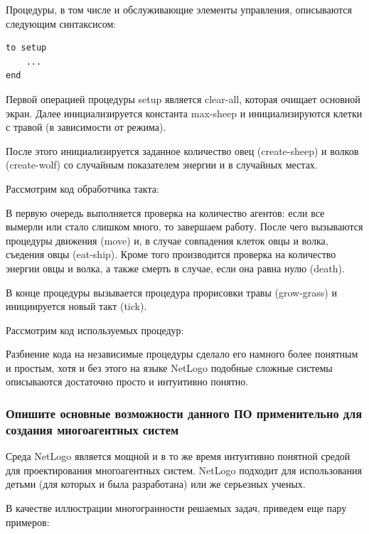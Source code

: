 \documentclass[14pt,a4paper,report]{report}
\begin{document}
Процедуры, в том числе и обслуживающие элементы управления, описываются следующим синтаксисом:

\begin{verbatim}
to setup
    ...
end
\end{verbatim}

Первой операцией процедуры setup является clear-all, которая очищает основной экран. Далее инициализируется константа max-sheep и инициализируются клетки с травой (в зависимости от режима).

После этого инициализируется заданное количество овец (create-sheep) и волков (create-wolf) со случайным показателем энергии и в случайных местах.

Рассмотрим код обработчика такта:



В первую очередь выполняется проверка на количество агентов: если все вымерли или стало слишком много, то завершаем работу. После чего вызываются процедуры движения (move) и, в случае совпадения клеток овцы и волка, съедения овцы (eat-ship). Кроме того производится проверка на количество энергии овцы и волка, а также смерть в случае, если она равна нулю (death).

В конце процедуры вызывается процедура прорисовки травы (grow-grass) и инициируется новый такт (tick).

Рассмотрим код используемых процедур:



Разбиение кода на независимые процедуры сделало его намного более понятным и простым, хотя и без этого на языке NetLogo подобные сложные системы описываются достаточно просто и интуитивно понятно.

\subsubsection{Опишите основные возможности данного ПО применительно для создания многоагентных систем}

Среда NetLogo является мощной и в то же время интуитивно понятной средой для проектирования многоагентных систем. NetLogo подходит для использования детьми (для которых и была разработана) или же серьезных ученых.

В качестве иллюстрации многогранности решаемых задач, приведем еще пару примеров:
\end{document}
